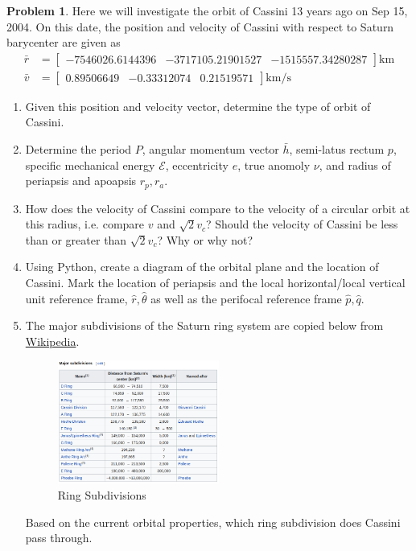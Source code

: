 \documentclass[10pt]{article}
\theoremstyle{definition}
\newtheorem{prob}{Problem}[section]
\newenvironment{subprob}%
{\renewcommand{\theenumi}{\alph{enumi}}\renewcommand{\labelenumi}{(\theenumi)}\begin{enumerate}}%
{\end{enumerate}}%
\begin{document}
\begin{prob}
    Here we will investigate the orbit of Cassini 13 years ago on Sep 15, 2004.
    On this date, the position and velocity of Cassini with respect to Saturn barycenter are given as 
    \begin{align*}
    \bar{r} &= \begin{bmatrix} -7546026.6144396 & -3717105.21901527 & -1515557.34280287\end{bmatrix} \si{\kilo\meter} \\
    \bar{v} &= \begin{bmatrix}  0.89506649 & -0.33312074  & 0.21519571 \end{bmatrix} \si{\kilo\meter\per\second}
    \end{align*}

    \begin{subprob}
        \item Given this position and velocity vector, determine the type of orbit of Cassini.
        \item Determine the period \( P \), angular momentum vector \( \bar h \), semi-latus rectum \( p \), specific mechanical energy \( \mathcal{E}\), eccentricity \( e \), true anomoly \( \nu \), and radius of periapsis and apoapsis \( r_p, r_a\).
        \item How does the velocity of Cassini compare to the velocity of a circular orbit at this radius, i.e. compare \( v \) and \( \sqrt{2} v_c \)?
            Should the velocity of Cassini be less than or greater than \( \sqrt{2} v_c \)? Why or why not?
        \item Using Python, create a diagram of the orbital plane and the location of Cassini.
            Mark the location of periapsis and the local horizontal/local vertical unit reference frame, \( \hat r, \hat \theta \) as well as the perifocal reference frame \( \hat p, \hat q \).
        \item The major subdivisions of the Saturn ring system are copied below from \href{https://en.wikipedia.org/wiki/Rings_of_Saturn#Major_subdivisions}{Wikipedia}.
            \begin{figure}[htbp]
                \centering
                \includegraphics[width=0.5\textwidth]{figures/ring_subdivisions.png}
                \caption{Ring Subdivisions}
            \end{figure}
            Based on the current orbital properties, which ring subdivision does Cassini pass through.
    \end{subprob}
\end{prob}
\end{document}
